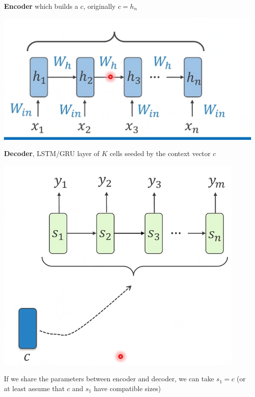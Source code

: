 \documentclass[10pt]{report}
\begin{document}
\begin{list}{}{}
	\item \textbf{Encoder} which builds a $c$, originally $c=h_n$
	\begin{center}
		\includegraphics[scale=0.5]{108.png}
	\end{center}
	\item \textbf{Decoder}, LSTM/GRU layer of $K$ cells seeded by the context vector $c$
	\begin{center}
		\includegraphics[scale=0.5]{109.png}
	\end{center}
	If we share the parameters between encoder and decoder, we can take $s_1 = c$ (or at least assume that $c$ and $s_1$ have compatible sizes)
	\begin{center}

\end{center}
\end{list}
\end{document}
